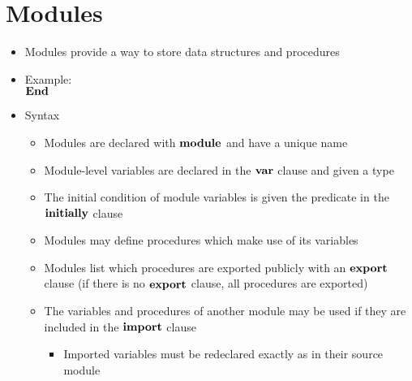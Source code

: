 \section{Modules}

\begin{itemize}
	
	\item Modules provide a way to store data structures and procedures
	
	\item Example:\\
	\gcl{1}{\Var ~ u : \textbf{set} \left[0, N\right)}
	$ {\bf End} $
	\item Syntax
	
	\begin{itemize}
		
		\item Modules are declared with $ {\bf module} $ and have a unique name
		
		\item Module-level variables are declared in the $ {\bf var} $ clause and given a type
		
		\item The initial condition of module variables is given the predicate in the $ {\bf initially} $ clause
		
		\item Modules may define procedures which make use of its variables
		
		\item Modules list which procedures are exported publicly with an $ {\bf export} $ clause (if there is no $ {\bf export} $ clause, all procedures are exported)
		
		\item The variables and procedures of another module may be used if they are included in the $ {\bf import} $ clause
		
		\begin{itemize}
			
			\item Imported variables must be redeclared exactly as in their source module
			

\end{itemize}
\end{itemize}
\end{itemize}
